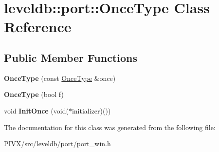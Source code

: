 \hypertarget{classleveldb_1_1port_1_1_once_type}{}\section{leveldb\+:\+:port\+:\+:Once\+Type Class Reference}
\label{classleveldb_1_1port_1_1_once_type}
\subsection*{Public Member Functions}
\begin{DoxyCompactItemize}
\item 
\mbox{\label{classleveldb_1_1port_1_1_once_type_a4864fc816a0b24c6b1fec13e10abd761}} 
{\bfseries Once\+Type} (const \mbox{\hyperlink{classleveldb_1_1port_1_1_once_type}{Once\+Type}} \&once)
\item 
\mbox{\label{classleveldb_1_1port_1_1_once_type_a40a7a521e5cc0fadded8a099a48bfad4}} 
{\bfseries Once\+Type} (bool f)
\item 
\mbox{\label{classleveldb_1_1port_1_1_once_type_a3bda12ab938f0d69dc6a51a741e36b4c}} 
void {\bfseries Init\+Once} (void($\ast$initializer)())
\end{DoxyCompactItemize}


The documentation for this class was generated from the following file\+:\begin{DoxyCompactItemize}
\item 
P\+I\+V\+X/src/leveldb/port/port\+\_\+win.\+h\end{DoxyCompactItemize}
